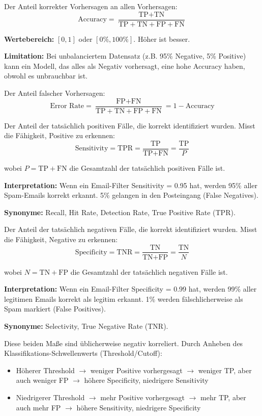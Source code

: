 Der Anteil korrekter Vorhersagen an allen Vorhersagen:
$$\text{Accuracy} = \frac{\text{TP} + \text{TN}}{\text{TP} + \text{TN} + \text{FP} + \text{FN}}$$

\textbf{Wertebereich:} $[0, 1]$ oder $[0\%, 100\%]$. Höher ist besser.

\textbf{Limitation:} Bei unbalanciertem Datensatz (z.B. 95\% Negative, 5\% Positive) kann ein Modell, das alles als Negativ vorhersagt, eine hohe Accuracy haben, obwohl es unbrauchbar ist.

Der Anteil falscher Vorhersagen:
$$\text{Error Rate} = \frac{\text{FP} + \text{FN}}{\text{TP} + \text{TN} + \text{FP} + \text{FN}} = 1 - \text{Accuracy}$$

Der Anteil der tatsächlich positiven Fälle, die korrekt identifiziert wurden. Misst die Fähigkeit, Positive zu erkennen:
$$\text{Sensitivity} = \text{TPR} = \frac{\text{TP}}{\text{TP} + \text{FN}} = \frac{\text{TP}}{P}$$

wobei $P = \text{TP} + \text{FN}$ die Gesamtzahl der tatsächlich positiven Fälle ist.

\textbf{Interpretation:} Wenn ein Email-Filter Sensitivity = 0.95 hat, werden 95\% aller Spam-Emails korrekt erkannt. 5\% gelangen in den Posteingang (False Negatives).

\textbf{Synonyme:} Recall, Hit Rate, Detection Rate, True Positive Rate (TPR).

Der Anteil der tatsächlich negativen Fälle, die korrekt identifiziert wurden. Misst die Fähigkeit, Negative zu erkennen:
$$\text{Specificity} = \text{TNR} = \frac{\text{TN}}{\text{TN} + \text{FP}} = \frac{\text{TN}}{N}$$

wobei $N = \text{TN} + \text{FP}$ die Gesamtzahl der tatsächlich negativen Fälle ist.

\textbf{Interpretation:} Wenn ein Email-Filter Specificity = 0.99 hat, werden 99\% aller legitimen Emails korrekt als legitim erkannt. 1\% werden fälschlicherweise als Spam markiert (False Positives).

\textbf{Synonyme:} Selectivity, True Negative Rate (TNR).

Diese beiden Maße sind üblicherweise negativ korreliert. Durch Anheben des Klassifikations-Schwellenwerts (Threshold/Cutoff):
\begin{itemize}[leftmargin=1.5em]
    \item Höherer Threshold $\to$ weniger Positive vorhergesagt $\to$ weniger TP, aber auch weniger FP $\to$ höhere Specificity, niedrigere Sensitivity
    \item Niedrigerer Threshold $\to$ mehr Positive vorhergesagt $\to$ mehr TP, aber auch mehr FP $\to$ höhere Sensitivity, niedrigere Specificity
\end{itemize}


